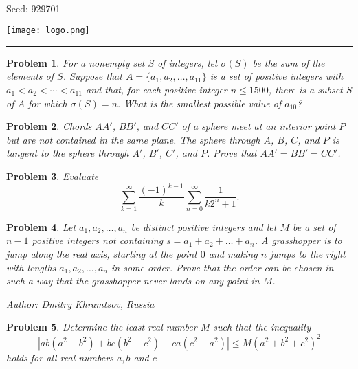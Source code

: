 \documentclass[12pt]{article}
\newtheorem{opg}{Problem}
\begin{document}
\parbox{0.6\textwidth}{ \\[2ex] {\Large Seed: 929701}}
\parbox{0.4\textwidth}{\texttt{[image: logo.png]}}

\hrule

\begin{opg}
For a nonempty set $S$ of integers, let $\sigma(S)$ be the sum of the elements of $S$. Suppose that $A = \{a_1, a_2, \ldots, a_{11}\}$ is a set of positive integers with $a_1 < a_2 < \cdots < a_{11}$ and that, for each positive integer $n \le 1500$, there is a subset $S$ of $A$ for which $\sigma(S) = n$. What is the smallest possible value of $a_{10}$?


\end{opg}
\begin{opg}
Chords $AA'$, $BB'$, and $CC'$ of a sphere meet at an interior point $P$ but are not contained in the same plane.  The sphere through $A$, $B$, $C$, and $P$ is tangent to the sphere through $A'$, $B'$, $C'$, and $P$.  Prove that $AA'=BB'=CC'$.


\end{opg}
\begin{opg}
Evaluate
\[
\sum_{k=1}^\infty \frac{(-1)^{k-1}}{k} \sum_{n=0}^\infty \frac{1}{k2^n + 1}.
\]
\end{opg}
\begin{opg}
Let $a_1,a_2,\ldots,a_n$ be distinct positive integers and let $M$ be a set of $n-1$ positive integers not containing $s=a_1+a_2+\ldots+a_n$. A grasshopper is to jump along the real axis, starting at the point $0$ and making $n$ jumps to the right with lengths $a_1,a_2,\ldots,a_n$ in some order. Prove that the order can be chosen in such a way that the grasshopper never lands on any point in $M$.

Author: Dmitry Khramtsov, Russia


\end{opg}
\begin{opg}
Determine the least real number $M$ such that the inequality \[\left| ab\left(a^{2}-b^{2}\right)+bc\left(b^{2}-c^{2}\right)+ca\left(c^{2}-a^{2}\right)\right|\leq M\left(a^{2}+b^{2}+c^{2}\right)^{2}\] holds for all real numbers $a,b$ and $c$


\end{opg}
\end{document}
